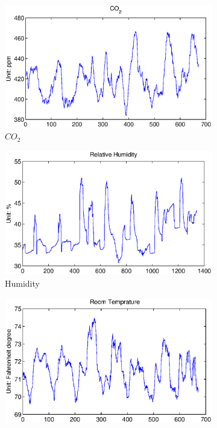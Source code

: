\begin{figure}[ht!]
\centering
  \begin{subfigure}{0.32\textwidth}
                \centering
    \includegraphics[width=\textwidth]{./fig/co2.eps}
                \caption{$CO_{2}$}
  \end{subfigure}
  \begin{subfigure}{0.32\textwidth}
                \centering
    \includegraphics[width=\textwidth]{./fig/rh.eps}
                \caption{Humidity}
  \end{subfigure}
  \begin{subfigure}{0.32\textwidth}
                \centering
    \includegraphics[width=\textwidth]{./fig/rmt.eps}

\end{subfigure}
\end{figure}
